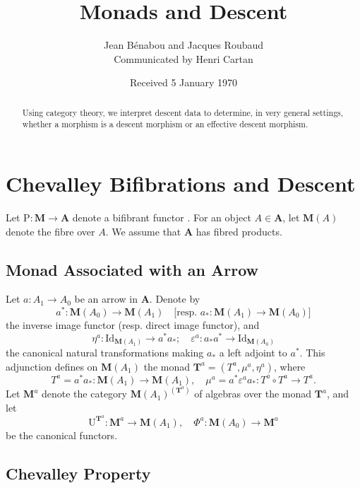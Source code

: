 \documentclass{article}
\title{Monads and Descent}
\author{Jean B\'enabou and Jacques Roubaud \\ Communicated by Henri Cartan}
\date{Received 5 January 1970}
\theoremstyle{plain}
\theoremstyle{remark}
\begin{document}
\maketitle

\begin{abstract}
Using category theory, we interpret descent data to determine, in very general settings, whether a morphism is a descent morphism or an effective descent morphism.
\end{abstract}


\section{Chevalley Bifibrations and Descent}

Let $\mathrm{P} : \mathbf{M} \to \mathbf{A}$ denote a bifibrant functor \cite{Grothendieck1959}. For an object $A \in \mathbf{A}$, let $\mathbf{M}(A)$ denote the fibre over $A$. We assume that $\mathbf{A}$ has fibred products.

\subsection{Monad Associated with an Arrow}

Let $a : A_1 \to A_0$ be an arrow in $\mathbf{A}$. Denote by
\[
a^* : \mathbf{M}(A_0) \to \mathbf{M}(A_1) \quad \text{[resp. } a_* : \mathbf{M}(A_1) \to \mathbf{M}(A_0)\text{]}
\]
the inverse image functor (resp. direct image functor), and
\[
\eta^a : \mathrm{Id}_{\mathbf{M}(A_1)} \to a^* a_*; \quad \varepsilon^a : a_* a^* \to \mathrm{Id}_{\mathbf{M}(A_0)}
\]
the canonical natural transformations making $a_*$ a left adjoint to $a^*$. This adjunction defines \cite{Linton1969} on $\mathbf{M}(A_1)$ the monad $\mathbf{T}^a = (T^a, \mu^a, \eta^a)$, where
\[
T^a = a^* a_* : \mathbf{M}(A_1) \to \mathbf{M}(A_1), \quad \mu^a = a^* \varepsilon^a a_* : T^a \circ T^a \to T^a.
\]
Let $\mathbf{M}^a$ denote the category $\mathbf{M}(A_1)^{(\mathbf{T}^a)}$ of algebras over the monad $\mathbf{T}^a$, and let
\[
\mathrm{U}^{\mathbf{T}^a} : \mathbf{M}^a \to \mathbf{M}(A_1), \quad \Phi^a : \mathbf{M}(A_0) \to \mathbf{M}^a
\]
be the canonical functors.

\subsection{Chevalley Property}
\end{document}

